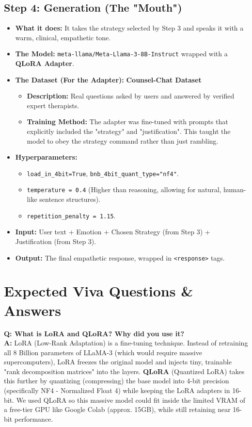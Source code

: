 \documentclass[12pt,a4paper]{article}
\begin{document}
\subsection{Step 4: Generation (The "Mouth")}
\begin{itemize}
    \item \textbf{What it does:} It takes the strategy selected by Step 3 and speaks it with a warm, clinical, empathetic tone.
    \item \textbf{The Model:} \texttt{meta-llama/Meta-Llama-3-8B-Instruct} wrapped with a \textbf{QLoRA Adapter}.
    \item \textbf{The Dataset (For the Adapter):} \textbf{Counsel-Chat Dataset}
    \begin{itemize}
        \item \textbf{Description:} Real questions asked by users and answered by verified expert therapists.
        \item \textbf{Training Method:} The adapter was fine-tuned with prompts that explicitly included the "strategy" and "justification". This taught the model to obey the strategy command rather than just rambling.
    \end{itemize}
    \item \textbf{Hyperparameters:} 
    \begin{itemize}
        \item \texttt{load\_in\_4bit=True}, \texttt{bnb\_4bit\_quant\_type="nf4"}.
        \item \texttt{temperature = 0.4} (Higher than reasoning, allowing for natural, human-like sentence structures).
        \item \texttt{repetition\_penalty = 1.15}.
    \end{itemize}
    \item \textbf{Input:} User text + Emotion + Chosen Strategy (from Step 3) + Justification (from Step 3).
    \item \textbf{Output:} The final empathetic response, wrapped in \texttt{<response>} tags.
\end{itemize}

\section{Expected Viva Questions \& Answers}

\textbf{Q: What is LoRA and QLoRA? Why did you use it?}\\
\textbf{A:} LoRA (Low-Rank Adaptation) is a fine-tuning technique. Instead of retraining all 8 Billion parameters of LLaMA-3 (which would require massive supercomputers), LoRA freezes the original model and injects tiny, trainable "rank decomposition matrices" into the layers. 
\textbf{QLoRA} (Quantized LoRA) takes this further by quantizing (compressing) the base model into 4-bit precision (specifically NF4 - Normalized Float 4) while keeping the LoRA adapters in 16-bit. We used QLoRA so this massive model could fit inside the limited VRAM of a free-tier GPU like Google Colab (approx. 15GB), while still retaining near 16-bit performance.
\end{document}

